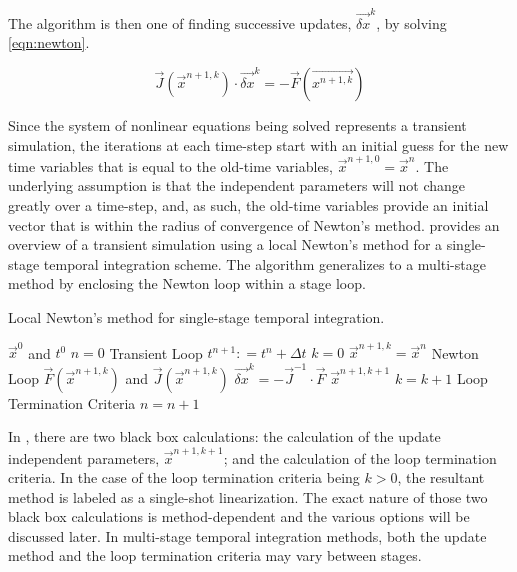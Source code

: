 The algorithm is then one of finding successive updates, $\vec{\delta x}^k$, by solving \eqref{eqn:newton}.

\begin{equation}
\label{eqn:newton}
\vec{J}(\vec{x}^{n+1,k})\cdot \vec{\delta x}^k = -\vec{F}(\vec{x^{n+1,k}})
\end{equation} 

Since the system of nonlinear equations being solved represents a transient simulation, the iterations at each time-step start with an initial guess for the new time variables that is equal to the old-time variables, $\vec{x}^{n+1,0} = \vec{x}^{n}$.
The underlying assumption is that the independent parameters will not change greatly over a time-step, and, as such, the old-time variables provide an initial vector that is within the radius of convergence of Newton's method.
 provides an overview of a transient simulation using a local Newton's method for a single-stage temporal integration scheme.
The algorithm generalizes to a multi-stage method by enclosing the Newton loop within a stage loop.

\begin{algo}[H]
\caption{Local Newton's method for single-stage temporal integration.}
\label{alg:local_newton}
\setlength{\baselineskip}{0.625\baselineskip}
\begin{algorithmic}[1]
\Require $\vec{x}^{0}$ and $t^{0}$
\Set $n = 0$
\Loop \; Transient Loop
    \State $t^{n+1} : = t^{n} + \Delta t$
    \State $k = 0$
    \State $\vec{x}^{n+1,k} = \vec{x}^{n}$
    \Loop \; Newton Loop
		\Calculate $\vec{F}(\vec{x}^{n+1,k})$ and $\vec{J}(\vec{x}^{n+1,k})$
		\Calculate $\vec{\delta x}^k = - \vec{J}^{-1}\cdot\vec{F}$
		\BlackBox $\vec{x}^{n+1,k+1}$
		\State $k = k + 1$
		\BlackBox Loop Termination Criteria
	\EndLoop
	\State $n = n + 1$
\EndLoop
\end{algorithmic}
\end{algo}

In , there are two black box calculations: the calculation of the update independent parameters, $\vec{x}^{n+1,k+1}$; and the calculation of the loop termination criteria.
In the case of the loop termination criteria being $k > 0$, the resultant method is labeled as a single-shot linearization.
The exact nature of those two black box calculations is method-dependent and the various options will be discussed later.
In multi-stage temporal integration methods, both the update method and the loop termination criteria may vary between stages. 


